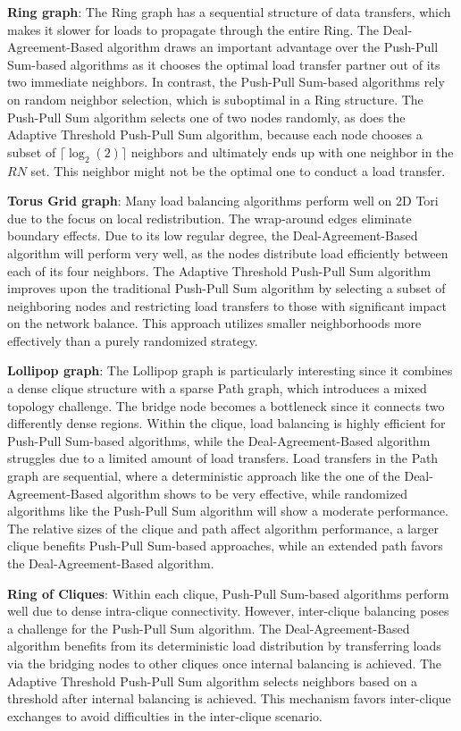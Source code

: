 \textbf{Ring graph}: The Ring graph has a sequential structure of data transfers, which makes it slower for loads to propagate through the entire Ring. The Deal-Agreement-Based algorithm draws an important advantage over the Push-Pull Sum-based algorithms as it chooses the optimal load transfer partner out of its two immediate neighbors. In contrast, the Push-Pull Sum-based algorithms rely on random neighbor selection, which is suboptimal in a Ring structure. The Push-Pull Sum algorithm selects one of two nodes randomly, as does the Adaptive Threshold Push-Pull Sum algorithm, because each node chooses a subset of $\lceil \log_{2}{(2)} \rceil$ neighbors and ultimately ends up with one neighbor in the $RN$ set. This neighbor might not be the optimal one to conduct a load transfer.

\textbf{Torus Grid graph}: Many load balancing algorithms perform well on 2D Tori due to the focus on local redistribution. The wrap-around edges eliminate boundary effects. Due to its low regular degree, the Deal-Agreement-Based algorithm will perform very well, as the nodes distribute load efficiently between each of its four neighbors. The Adaptive Threshold Push-Pull Sum algorithm improves upon the traditional Push-Pull Sum algorithm by selecting a subset of neighboring nodes and restricting load transfers to those with significant impact on the network balance. This approach utilizes smaller neighborhoods more effectively than a purely randomized strategy.

\textbf{Lollipop graph}: The Lollipop graph is particularly interesting since it combines a dense clique structure with a sparse Path graph, which introduces a mixed topology challenge. The bridge node becomes a bottleneck since it connects two differently dense regions. Within the clique, load balancing is highly efficient for Push-Pull Sum-based algorithms, while the Deal-Agreement-Based algorithm struggles due to a limited amount of load transfers. Load transfers in the Path graph are sequential, where a deterministic approach like the one of the Deal-Agreement-Based algorithm shows to be very effective, while randomized algorithms like the Push-Pull Sum algorithm will show a moderate performance. The relative sizes of the clique and path affect algorithm performance, a larger clique benefits Push-Pull Sum-based approaches, while an extended path favors the Deal-Agreement-Based algorithm.

\textbf{Ring of Cliques}: Within each clique, Push-Pull Sum-based algorithms perform well due to dense intra-clique connectivity. However, inter-clique balancing poses a challenge for the Push-Pull Sum algorithm. The Deal-Agreement-Based algorithm benefits from its deterministic load distribution by transferring loads via the bridging nodes to other cliques once internal balancing is achieved. The Adaptive Threshold Push-Pull Sum algorithm selects neighbors based on a threshold after internal balancing is achieved. This mechanism favors inter-clique exchanges to avoid difficulties in the inter-clique scenario.